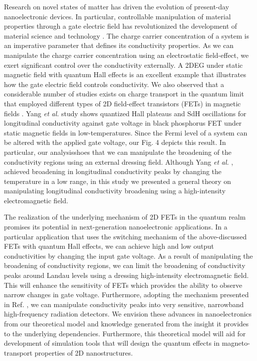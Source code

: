 \documentclass{article}
\begin{document}
\begin{itemize}
{  Research on novel states of matter has driven the evolution of present-day nanoelectronic devices. In particular, controllable manipulation of material properties through a gate electric field has revolutionized the development of material science and technology \cite{ahn03,deng18}.
  The charge carrier concentration of a system is an imperative parameter that defines its conductivity properties.
  As we can manipulate the charge carrier concentration using an electrostatic field-effect, we exert significant control over the conductivity externally.
  A 2DEG under static magnetic field with quantum Hall effects is an excellent example that illustrates how the gate electric field controls conductivity.
  We also observed that a considerable number of studies exists on charge transport in the quantum limit that employed different types of 2D field-effect transistors (FETs) in magnetic fields \cite{wakabayashi78,yang18,long20,li14}. Yang \textit{et al.} \cite{yang18} study shows quantized Hall plateaus and SdH oscillations for longitudinal conductivity against gate voltage in black phosphorus FET under static magnetic fields in low-temperatures. Since the Fermi level of a system can be altered with the applied gate voltage, our Fig. 4 depicts this result.
  In particular, our analysisshoes that we can manipulate the broadening of the conductivity regions using an external dressing field. Although Yang \textit{et al.} \cite{yang18}, achieved broadening in longitudinal conductivity peaks by changing the temperature in a low range, in this study we presented a general theory on manipulating longitudinal conductivity broadening using a high-intensity electromagnetic field.

  The realization of the underlying mechanism of 2D FETs in the quantum realm promises its potential in next-generation nanoelectronic applications. In a particular application that uses the switching mechanism of the above-discussed FETs with quantum Hall effects, we can achieve high and low output conductivities by changing the input gate voltage. As a result of manipulating the broadening of conductivity regions, we can limit the broadening of conductivity peaks around Landau levels using a dressing high-intensity electromagnetic field. This will enhance the sensitivity of FETs which provides the ability to observe narrow changes in gate voltage.
  Furthermore, adopting the mechanism presented in Ref. \cite{hirakawa01}, we can manipulate conductivity peaks into very sensitive, narrowband high-frequency radiation detectors.
  We envision these advances in nanoelectronics from our theoretical model and knowledge generated from the insight it provides to the underlying dependencies.
  Furthermore, this theoretical model will aid for development of simulation tools that will design the quantum effects in
magneto-transport properties of 2D nanostructures.
  }
\end{itemize}
\end{document}
